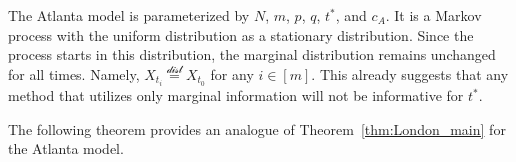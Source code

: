 \documentclass[12pt]{article}
\theoremstyle{definition}
\begin{document}
The Atlanta model is parameterized by $N$, $m$, $p$, $q$, $t^*$, and $c_A$. 
It is a Markov process with the uniform distribution as a stationary distribution. 
Since the process starts in this distribution, the marginal distribution remains unchanged for all times. Namely, $X_{t_i} \overset{\mathcal{\text{dist}}}{=} X_{t_0}$ for any $i \in [m]$.
This already suggests that any method that utilizes only marginal information will not be informative for $t^*$.


The following theorem provides an analogue of Theorem~\ref{thm:London_main} for the Atlanta model.
\end{document}
